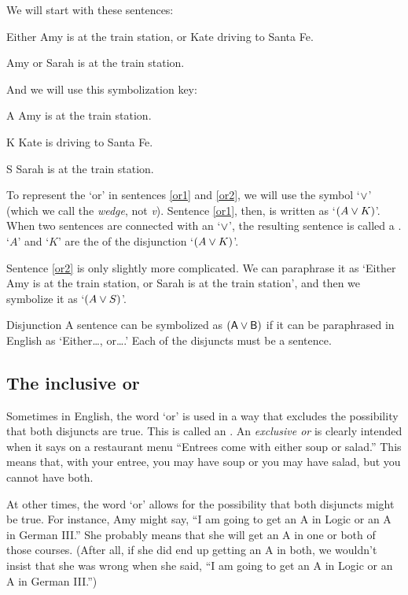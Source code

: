 We will start with these sentences:
	\begin{earg}
		\item[\ex{or1}] Either Amy is at the train station, or Kate driving to Santa Fe.
		\item[\ex{or2}] Amy or Sarah is at the train station. 
	\end{earg}
And we will use this symbolization key:
	\begin{ekey}
		\item[A] Amy is at the train station.
		\item[K] Kate is driving to Santa Fe.
		\item[S] Sarah is at the train station.
	\end{ekey}
To represent the `or' in sentences \ref{or1} and \ref{or2}, we will use the symbol `$\vee$' (which we call the \textit{wedge}, not \textit{v}). Sentence \ref{or1}, then, is written as `$(A \vee K)$'. When two sentences are connected with an `$\vee$', the resulting sentence is called a . `$A$' and `$K$' are the  of the disjunction `$(A \vee K)$'.

Sentence \ref{or2} is only slightly more complicated. We can paraphrase it as `Either Amy is at the train station, or Sarah is at the train station', and then we symbolize it as `$(A \vee S)$'.

\begin{factboxy}{Disjunction}
		A sentence can be symbolized as $(\mathsf{A}\vee\mathsf{B})$ if it can be paraphrased in English as `Either\ldots, or\ldots.' Each of the disjuncts must be a sentence.
\end{factboxy}

\subsection{The inclusive or}

Sometimes in English, the word `or' is used in a way that excludes the possibility that both disjuncts are true. This is called an .  An \emph{exclusive or} is clearly intended when it says on a restaurant menu ``Entrees come with either soup or salad.'' This means that, with your entree, you may have soup or you may have salad, but you cannot have both.

At other times, the word `or' allows for the possibility that both disjuncts might be true. For instance, Amy might say, ``I am going to get an A in Logic or an A in German III.'' She probably means that she will get an A in one or both of those courses. (After all, if she did end up getting an A in both, we wouldn't insist that she was wrong when she said, ``I am going to get an A in Logic or an A in German III.'')

